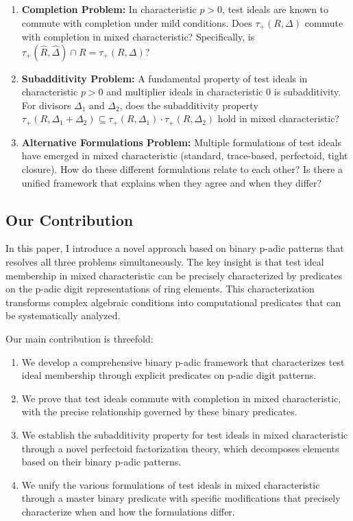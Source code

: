 \begin{enumerate}
    \item \textbf{Completion Problem:} In characteristic $p > 0$, test ideals are known to commute with completion under mild conditions. Does $\tau_+(R,\Delta)$ commute with completion in mixed characteristic? Specifically, is $\tau_+(\hat{R},\hat{\Delta}) \cap R = \tau_+(R,\Delta)$?
    
    \item \textbf{Subadditivity Problem:} A fundamental property of test ideals in characteristic $p > 0$ and multiplier ideals in characteristic 0 is subadditivity. For divisors $\Delta_1$ and $\Delta_2$, does the subadditivity property $\tau_+(R,\Delta_1+\Delta_2) \subseteq \tau_+(R,\Delta_1) \cdot \tau_+(R,\Delta_2)$ hold in mixed characteristic?
    
    \item \textbf{Alternative Formulations Problem:} Multiple formulations of test ideals have emerged in mixed characteristic (standard, trace-based, perfectoid, tight closure). How do these different formulations relate to each other? Is there a unified framework that explains when they agree and when they differ?
\end{enumerate}

\subsection{Our Contribution}

In this paper, I introduce a novel approach based on binary p-adic patterns that resolves all three problems simultaneously. The key insight is that test ideal membership in mixed characteristic can be precisely characterized by predicates on the p-adic digit representations of ring elements. This characterization transforms complex algebraic conditions into computational predicates that can be systematically analyzed.

Our main contribution is threefold:

\begin{enumerate}
    \item We develop a comprehensive binary p-adic framework that characterizes test ideal membership through explicit predicates on p-adic digit patterns.
    
    \item We prove that test ideals commute with completion in mixed characteristic, with the precise relationship governed by these binary predicates.
    
    \item We establish the subadditivity property for test ideals in mixed characteristic through a novel perfectoid factorization theory, which decomposes elements based on their binary p-adic patterns.
    
    \item We unify the various formulations of test ideals in mixed characteristic through a master binary predicate with specific modifications that precisely characterize when and how the formulations differ.
\end{enumerate}

